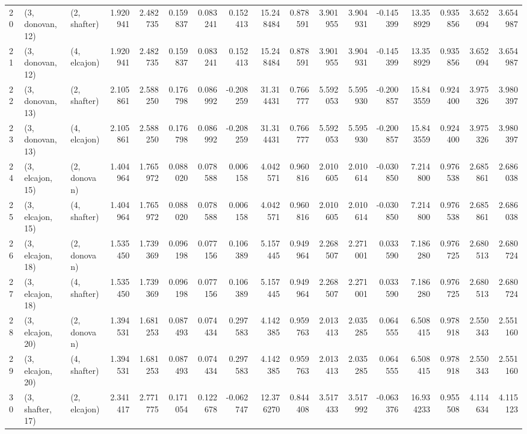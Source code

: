 \begin{tabular}{lllrrrrrrrrrrrrrr}
20 &  (3, donovan, 12) &     (2, shafter) &  1.920941 &  2.482735 &   0.159837 &  0.083241 &  0.152413 &  15.248484 &  0.878591 &   3.901955 &  3.904931 & -0.145399 &  13.358929 &  0.935856 &  3.652094 &  3.654987 \\
21 &  (3, donovan, 12) &     (4, elcajon) &  1.920941 &  2.482735 &   0.159837 &  0.083241 &  0.152413 &  15.248484 &  0.878591 &   3.901955 &  3.904931 & -0.145399 &  13.358929 &  0.935856 &  3.652094 &  3.654987 \\
22 &  (3, donovan, 13) &     (2, shafter) &  2.105861 &  2.588250 &   0.176798 &  0.086992 & -0.208259 &  31.314431 &  0.766777 &   5.592053 &  5.595930 & -0.200857 &  15.843559 &  0.924400 &  3.975326 &  3.980397 \\
23 &  (3, donovan, 13) &     (4, elcajon) &  2.105861 &  2.588250 &   0.176798 &  0.086992 & -0.208259 &  31.314431 &  0.766777 &   5.592053 &  5.595930 & -0.200857 &  15.843559 &  0.924400 &  3.975326 &  3.980397 \\
24 &  (3, elcajon, 15) &     (2, donovan) &  1.404964 &  1.765972 &   0.088020 &  0.078588 &  0.006158 &   4.042571 &  0.960816 &   2.010605 &  2.010614 & -0.030850 &   7.214800 &  0.976538 &  2.685861 &  2.686038 \\
25 &  (3, elcajon, 15) &     (4, shafter) &  1.404964 &  1.765972 &   0.088020 &  0.078588 &  0.006158 &   4.042571 &  0.960816 &   2.010605 &  2.010614 & -0.030850 &   7.214800 &  0.976538 &  2.685861 &  2.686038 \\
26 &  (3, elcajon, 18) &     (2, donovan) &  1.535450 &  1.739369 &   0.096198 &  0.077156 &  0.106389 &   5.157445 &  0.949964 &   2.268507 &  2.271001 &  0.033590 &   7.186280 &  0.976725 &  2.680513 &  2.680724 \\
27 &  (3, elcajon, 18) &     (4, shafter) &  1.535450 &  1.739369 &   0.096198 &  0.077156 &  0.106389 &   5.157445 &  0.949964 &   2.268507 &  2.271001 &  0.033590 &   7.186280 &  0.976725 &  2.680513 &  2.680724 \\
28 &  (3, elcajon, 20) &     (2, donovan) &  1.394531 &  1.681253 &   0.087493 &  0.074434 &  0.297583 &   4.142385 &  0.959763 &   2.013413 &  2.035285 &  0.064555 &   6.508415 &  0.978918 &  2.550343 &  2.551160 \\
29 &  (3, elcajon, 20) &     (4, shafter) &  1.394531 &  1.681253 &   0.087493 &  0.074434 &  0.297583 &   4.142385 &  0.959763 &   2.013413 &  2.035285 &  0.064555 &   6.508415 &  0.978918 &  2.550343 &  2.551160 \\
30 &  (3, shafter, 17) &     (2, elcajon) &  2.341417 &  2.771775 &   0.171054 &  0.122678 & -0.062747 &  12.376270 &  0.844408 &   3.517433 &  3.517992 & -0.063376 &  16.934233 &  0.955508 &  4.114634 &  4.115123 \\

\end{tabular}
